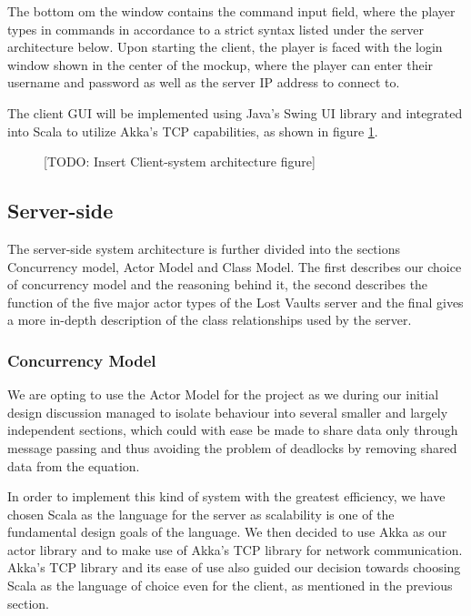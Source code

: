 \documentclass[a4paper]{article}
\begin{document}
The bottom om the window contains the command input field, where the player types in commands in accordance to a strict syntax listed under the server architecture below.
Upon starting the client, the player is faced with the login window shown in the center of the mockup, where the player can enter their username and password as well as the server IP address to connect to.

The client GUI will be implemented using Java's Swing UI library and integrated into Scala to utilize Akka's TCP capabilities, as shown in figure \ref{fig:ClientArch}.
\begin{figure}[hbt]
\centering
\caption{\label{fig:ClientArch}[TODO: Insert Client-system architecture figure]}
\end{figure}
\subsection{Server-side}
The server-side system architecture is further divided into the sections Concurrency model, Actor Model and Class Model. The first describes our choice of concurrency model and the 
reasoning behind it, the second describes  the function of the five major actor types of the Lost Vaults server and the final gives a more in-depth description of the 
class relationships used by the server.
\subsubsection{Concurrency Model}
We are opting to use the Actor Model for the project as we during our initial design discussion managed to isolate behaviour into several smaller and largely independent sections, 
which could with ease be made to share data only through message passing and thus avoiding the problem of deadlocks by removing shared data from the equation. 

In order to implement this kind of system with the greatest efficiency, we have chosen Scala as the language for the server as scalability is one of the fundamental design goals 
of the language. We then decided to use Akka as our actor library and to make use of Akka's TCP library for network communication. Akka's TCP library and its ease of use also 
guided our decision towards choosing Scala as the language of choice even for the client, as mentioned in the previous section.
\end{document}
